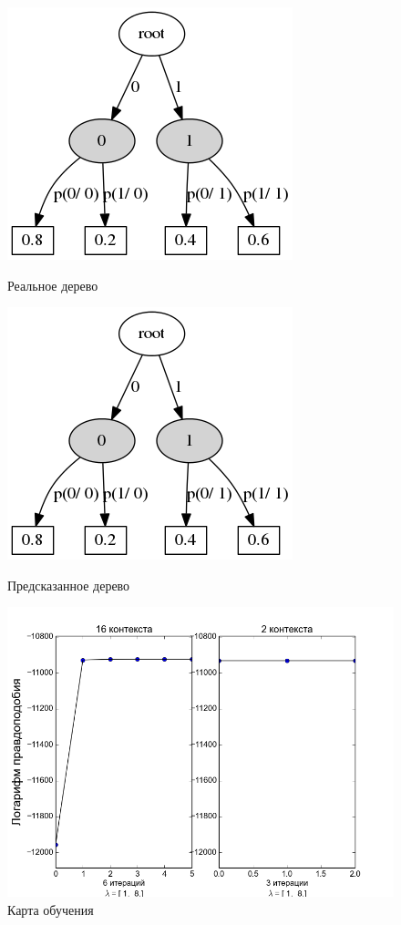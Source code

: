 \documentclass{matmex-diploma-custom}
\begin{document}
\begin{figure}[h!]\centering
\begin{minipage}[b]{0.49 \textwidth}
	\includegraphics[scale=0.4]{img/sample_hmm1/real_trie_.png}
	\centering
	\caption{ Реальное дерево }
	\label{ris:sample_hmm1_real_trie}
\end{minipage}
\hfil \hfil%
\begin{minipage}[b]{0.49 \textwidth}
	\includegraphics[scale=0.4]{img/sample_hmm1/predicted_trie.png}
	\centering
	\caption{ Предсказанное дерево }
	\label{ris:sample_hmm1_predicted_trie}
\end{minipage}
\begin{minipage}[b]{0.8 \textwidth}
	\includegraphics[scale=0.4]{img/sample_hmm1/plot_.png}
	\centering
	\caption{ Карта обучения }
	\label{ris:sample_hmm1_log_likelihood}
\end{minipage}
\end{figure}
\end{document}
